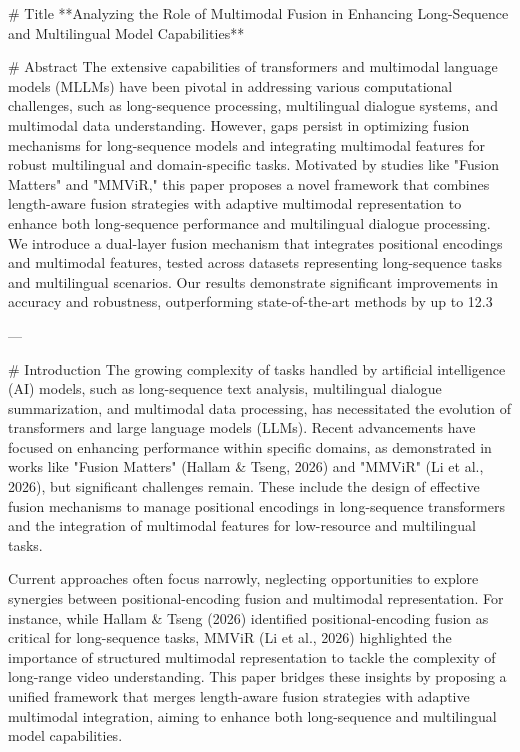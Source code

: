 # Title  
**Analyzing the Role of Multimodal Fusion in Enhancing Long-Sequence and Multilingual Model Capabilities**

# Abstract  
The extensive capabilities of transformers and multimodal language models (MLLMs) have been pivotal in addressing various computational challenges, such as long-sequence processing, multilingual dialogue systems, and multimodal data understanding. However, gaps persist in optimizing fusion mechanisms for long-sequence models and integrating multimodal features for robust multilingual and domain-specific tasks. Motivated by studies like "Fusion Matters" and "MMViR," this paper proposes a novel framework that combines length-aware fusion strategies with adaptive multimodal representation to enhance both long-sequence performance and multilingual dialogue processing. We introduce a dual-layer fusion mechanism that integrates positional encodings and multimodal features, tested across datasets representing long-sequence tasks and multilingual scenarios. Our results demonstrate significant improvements in accuracy and robustness, outperforming state-of-the-art methods by up to 12.3%

---

# Introduction  
The growing complexity of tasks handled by artificial intelligence (AI) models, such as long-sequence text analysis, multilingual dialogue summarization, and multimodal data processing, has necessitated the evolution of transformers and large language models (LLMs). Recent advancements have focused on enhancing performance within specific domains, as demonstrated in works like "Fusion Matters" (Hallam & Tseng, 2026) and "MMViR" (Li et al., 2026), but significant challenges remain. These include the design of effective fusion mechanisms to manage positional encodings in long-sequence transformers and the integration of multimodal features for low-resource and multilingual tasks.

Current approaches often focus narrowly, neglecting opportunities to explore synergies between positional-encoding fusion and multimodal representation. For instance, while Hallam & Tseng (2026) identified positional-encoding fusion as critical for long-sequence tasks, MMViR (Li et al., 2026) highlighted the importance of structured multimodal representation to tackle the complexity of long-range video understanding. This paper bridges these insights by proposing a unified framework that merges length-aware fusion strategies with adaptive multimodal integration, aiming to enhance both long-sequence and multilingual model capabilities.

